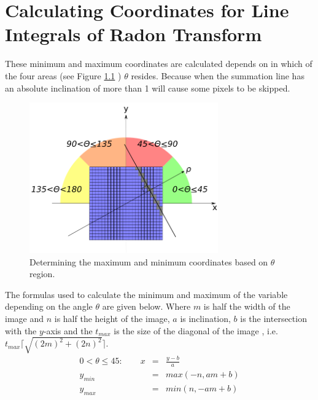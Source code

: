 
\chapter{Calculating Coordinates for Line Integrals of Radon Transform} %

\label{AppendixA} %


These minimum and maximum coordinates are calculated depends on in which of the four areas (see Figure \ref{fig:areas} ) $\theta$ resides. Because when the summation line has an absolute inclination of more than 1 will cause some pixels to be skipped.

\begin{figure}[H]
	\centering
		\includegraphics[width=230pt]{Figures/regions.png}
	\caption[Minimum and maximum coordinates in each region.]{Determining the maximum and minimum coordinates based on $\theta$ region.}
	\label{fig:areas}
\end{figure}


The formulas used to calculate the minimum and maximum of the variable depending on the angle $\theta$ are given below. Where $m$ is half the width of the image and $n$ is half the height of the image, $a$ is inclination, $b$ is 	the intersection with the $y$-axis and the $t_{max}$ is the size of the diagonal of the image , i.e. $t_{max}\lceil \sqrt{(2m)^2 + (2n)^2}\rceil$.
\begin{eqnarray}
0 < \theta \leq 45: \qquad  x &=& \frac{y-b}{a} \nonumber \\
	y_{min} &=& max(-n, am + b) \nonumber \\
	y_{max} &=& min(n, -am + b) \nonumber 
\end{eqnarray}

